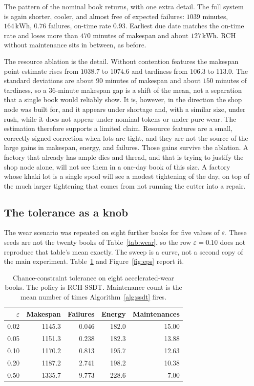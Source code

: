 The pattern of the nominal book returns, with one extra detail. The full system is again shorter, cooler, and almost free of expected failures: \(1039\) minutes, \(164\,\mathrm{kWh}\), \(0.76\) failures, on-time rate \(0.93\). Earliest due date matches the on-time rate and loses more than \(470\) minutes of makespan and about \(127\,\mathrm{kWh}\). RCH without maintenance sits in between, as before.

The resource ablation is the detail. Without contention features the makespan point estimate rises from \(1038.7\) to \(1074.6\) and tardiness from \(106.3\) to \(113.0\). The standard deviations are about \(90\) minutes of makespan and about \(150\) minutes of tardiness, so a \(36\)-minute makespan gap is a shift of the mean, not a separation that a single book would reliably show. It is, however, in the direction the shop node was built for, and it appears under shortage and, with a similar size, under rush, while it does not appear under nominal tokens or under pure wear. The estimation therefore supports a limited claim. Resource features are a small, correctly signed correction when lots are tight, and they are not the source of the large gains in makespan, energy, and failures. Those gains survive the ablation. A factory that already has ample dies and thread, and that is trying to justify the shop node alone, will not see them in a one-day book of this size. A factory whose khaki lot is a single spool will see a modest tightening of the day, on top of the much larger tightening that comes from not running the cutter into a repair.

\subsection{The tolerance as a knob}

The wear scenario was repeated on eight further books for five values of \(\varepsilon\). These seeds are not the twenty books of Table~\ref{tab:wear}, so the row \(\varepsilon = 0.10\) does not reproduce that table's mean exactly. The sweep is a curve, not a second copy of the main experiment. Table~\ref{tab:eps} and Figure~\ref{fig:eps} report it.

\begin{table}[ht]
\centering
\caption{Chance-constraint tolerance on eight accelerated-wear books. The policy is RCH-SSDT. Maintenance count is the mean number of times Algorithm~\ref{alg:ssdt} fires.}
\label{tab:eps}
\small
\begin{tabular}{rrrrr}
\toprule
\(\varepsilon\) & Makespan & Failures & Energy & Maintenances \\
\midrule
0.02 & 1145.3 & 0.046 & 182.0 & 15.00 \\
0.05 & 1151.3 & 0.238 & 182.3 & 13.88 \\
0.10 & 1170.2 & 0.813 & 195.7 & 12.63 \\
0.20 & 1187.2 & 2.741 & 198.2 & 10.38 \\
0.50 & 1335.7 & 9.773 & 228.6 & 7.00 \\
\bottomrule
\end{tabular}
\end{table}

